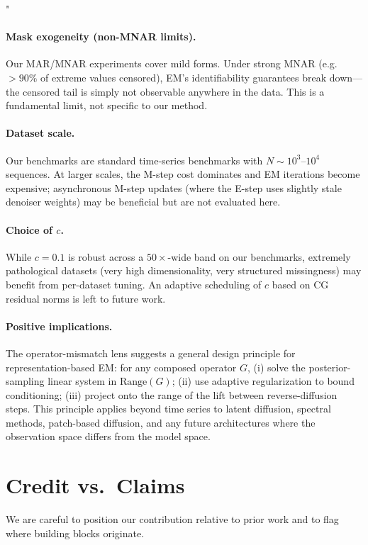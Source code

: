 "\documentclass{article}
\theoremstyle{plain}
\theoremstyle{definition}
\theoremstyle{remark}
\begin{document}
\paragraph{Mask exogeneity (non-MNAR limits).}
Our MAR/MNAR experiments cover mild forms. Under strong MNAR (e.g.\ $>90\%$ of extreme values censored), EM's identifiability guarantees break down---the censored tail is simply not observable anywhere in the data. This is a fundamental limit, not specific to our method.

\paragraph{Dataset scale.}
Our benchmarks are standard time-series benchmarks with $N \sim 10^3$--$10^4$ sequences. At larger scales, the M-step cost dominates and EM iterations become expensive; asynchronous M-step updates (where the E-step uses slightly stale denoiser weights) may be beneficial but are not evaluated here.

\paragraph{Choice of $c$.}
While $c = 0.1$ is robust across a $50\times$-wide band on our benchmarks, extremely pathological datasets (very high dimensionality, very structured missingness) may benefit from per-dataset tuning. An adaptive scheduling of $c$ based on CG residual norms is left to future work.

\paragraph{Positive implications.}
The operator-mismatch lens suggests a general design principle for representation-based EM: for any composed operator $G$, (i) solve the posterior-sampling linear system in $\mathrm{Range}(G)$; (ii) use adaptive regularization to bound conditioning; (iii) project onto the range of the lift between reverse-diffusion steps. This principle applies beyond time series to latent diffusion, spectral methods, patch-based diffusion, and any future architectures where the observation space differs from the model space.

\section{Credit vs.\ Claims}
\label{app:credit}

We are careful to position our contribution relative to prior work and to flag where building blocks originate.
\end{document}
